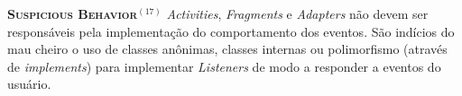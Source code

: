   \noindent
  \textsc{\textbf{{\small Suspicious Behavior}}}$^{(17)}$ \textit{Activities}, \textit{Fragments} e \textit{Adapters} não devem ser responsáveis pela implementação do comportamento dos eventos. São indícios do mau cheiro o uso de classes anônimas, classes internas ou polimorfismo (através de \textit{implements}) para implementar \textit{Listeners} de modo a responder a eventos do usuário.



